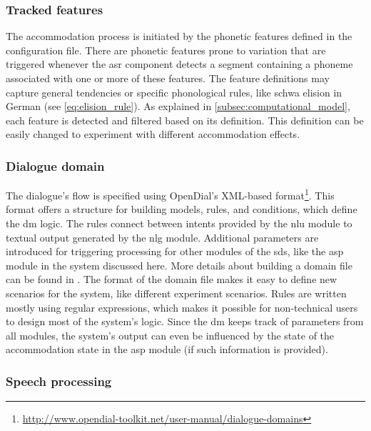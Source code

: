 \subsubsection{Tracked features}
\label{subsubsec:tracked_features}

The accommodation process is initiated by the phonetic features defined in the configuration file.
There are phonetic features prone to variation that are triggered whenever the \ac{asr} component detects a segment containing a phoneme associated with one or more of these features.
The feature definitions may capture general tendencies or specific phonological rules, like schwa elision in German (see \cref{eq:elision_rule}).
As explained in \cref{subsec:computational_model}, each feature is detected and filtered based on its definition.
This definition can be easily changed to experiment with different accommodation effects.

\subsubsection{Dialogue domain}
\label{subsubsec:dialogue_domain}

The dialogue's flow is specified using OpenDial's XML-based format\footnote{\url{http://www.opendial-toolkit.net/user-manual/dialogue-domains}}.
This format offers a structure for building models, rules, and conditions, which define the \ac{dm} logic.
The rules connect between intents provided by the \ac{nlu} module to textual output generated by the \ac{nlg} module.
Additional parameters are introduced for triggering processing for other modules of the \ac{sds}, like the \ac{asp} module in the system discussed here.
More details about building a domain file can be found in \citet{Lison2016opendial}.
The format of the domain file makes it easy to define new scenarios for the system, like different experiment scenarios.
Rules are written mostly using regular expressions, which makes it possible for non-technical users to design most of the system's logic.
Since the \ac{dm} keeps track of parameters from all modules, the system's output can even be influenced by the state of the accommodation state in the \ac{asp} module (if such information is provided).

\subsubsection{Speech processing}
\label{subsubsec:speech_processing}

